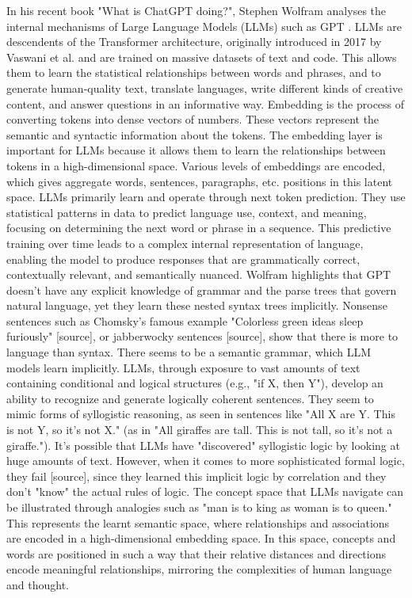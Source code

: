 
In his recent book "What is ChatGPT doing?", Stephen Wolfram analyses the internal mechanisms of Large Language Models (LLMs) such as GPT \cite{wolfram2023chatgpt}.
LLMs are descendents of the Transformer architecture, originally introduced in 2017 by Vaswani et al. \cite{Vaswani_Shazeer_Parmar_Uszkoreit_Jones_Gomez_Kaiser_Polosukhin_2017} and are trained on massive datasets of text and code. This allows them to learn the statistical relationships between words and phrases, and to generate human-quality text, translate languages, write different kinds of creative content, and answer questions in an informative way.
Embedding is the process of converting tokens into dense vectors of numbers. These vectors represent the semantic and syntactic information about the tokens. The embedding layer is important for LLMs because it allows them to learn the relationships between tokens in a high-dimensional space.
Various levels of embeddings are encoded, which gives aggregate words, sentences, paragraphs, etc. positions in this latent space.
LLMs primarily learn and operate through next token prediction. They use statistical patterns in data to predict language use, context, and meaning, focusing on determining the next word or phrase in a sequence. This predictive training over time leads to a complex internal representation of language, enabling the model to produce responses that are grammatically correct, contextually relevant, and semantically nuanced.
Wolfram highlights that GPT doesn't have any explicit knowledge of grammar and the parse trees that govern natural language, yet they learn these nested syntax trees implicitly. 
Nonsense sentences such as Chomsky's famous example "Colorless green ideas sleep furiously" [source], or jabberwocky sentences [source], show that there is more to language than syntax. There seems to be a semantic grammar, which LLM models learn implicitly.
LLMs, through exposure to vast amounts of text containing conditional and logical structures (e.g., "if X, then Y"), develop an ability to recognize and generate logically coherent sentences. They seem to mimic forms of syllogistic reasoning, as seen in sentences like "All X are Y. This is not Y, so it's not X." (as in "All giraffes are tall. This is not tall, so it's not a giraffe."). 
It's possible that LLMs have "discovered" syllogistic logic by looking at huge amounts of text. However, when it comes to more sophisticated formal logic, they fail [source], since they learned this implicit logic by correlation and they don't "know" the actual rules of logic.
The concept space that LLMs navigate can be illustrated through analogies such as "man is to king as woman is to queen." This represents the learnt semantic space, where relationships and associations are encoded in a high-dimensional embedding space. In this space, concepts and words are positioned in such a way that their relative distances and directions encode meaningful relationships, mirroring the complexities of human language and thought.


